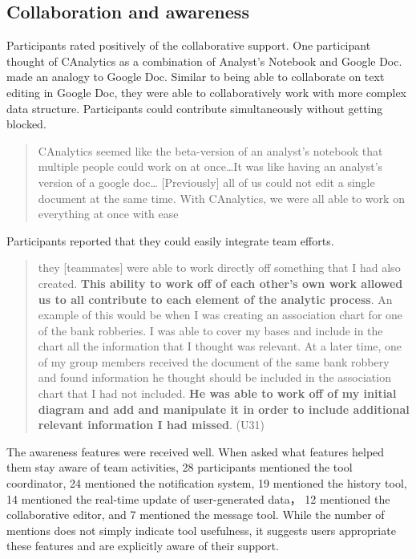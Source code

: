 \subsection{Collaboration and
awareness}\label{collaboration-and-awareness}

Participants rated positively of the collaborative support. One
participant thought of CAnalytics as a combination of Analyst's Notebook
and Google Doc. made an analogy to Google Doc. Similar to being able to
collaborate on text editing in Google Doc, they were able to
collaboratively work with more complex data structure. Participants
could contribute simultaneously without getting blocked.

\begin{quote}
CAnalytics seemed like the beta-version of an analyst's notebook that
multiple people could work on at once\ldots{}It was like having an
analyst's version of a google doc\ldots{} {[}Previously{]} all of us
could not edit a single document at the same time. With CAnalytics, we
were all able to work on everything at once with ease
\end{quote}

Participants reported that they could easily integrate team efforts.

\begin{quote}
they {[}teammates{]} were able to work directly off something that I had
also created. \textbf{This ability to work off of each other's own work
allowed us to all contribute to each element of the analytic process}.
An example of this would be when I was creating an association chart for
one of the bank robberies. I was able to cover my bases and include in
the chart all the information that I thought was relevant. At a later
time, one of my group members received the document of the same bank
robbery and found information he thought should be included in the
association chart that I had not included. \textbf{He was able to work
off of my initial diagram and add and manipulate it in order to include
additional relevant information I had missed}. (U31)
\end{quote}

The awareness features were received well. When asked what features
helped them stay aware of team activities, 28 participants mentioned the
tool coordinator, 24 mentioned the notification system, 19 mentioned the
history tool, 14 mentioned the real-time update of user-generated data，
12 mentioned the collaborative editor, and 7 mentioned the message tool.
While the number of mentions does not simply indicate tool usefulness,
it suggests users appropriate these features and are explicitly aware of
their support.

